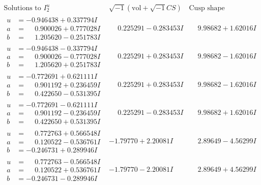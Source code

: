 \documentclass[1p]{elsarticle_modified}
\theoremstyle{definition}
\newcommand{\I}{\sqrt{-1}}
\begin{document}
$$\begin{array}{c|c|c}  
\text{Solutions to }I^u_{2}& \I (\text{vol} + \sqrt{-1}CS) & \text{Cusp shape}\\
 \hline 
\begin{aligned}
u &= -0.946438 + 0.337794 I \\
a &= \phantom{-}0.900026 + 0.777028 I \\
b &= \phantom{-}1.205620 - 0.251783 I\end{aligned}
 & \phantom{-}0.225291 - 0.283453 I & \phantom{-}9.98682 + 1.62016 I \\ \hline\begin{aligned}
u &= -0.946438 - 0.337794 I \\
a &= \phantom{-}0.900026 - 0.777028 I \\
b &= \phantom{-}1.205620 + 0.251783 I\end{aligned}
 & \phantom{-}0.225291 + 0.283453 I & \phantom{-}9.98682 - 1.62016 I \\ \hline\begin{aligned}
u &= -0.772691 + 0.621111 I \\
a &= \phantom{-}0.901192 + 0.236459 I \\
b &= \phantom{-}0.422650 - 0.531395 I\end{aligned}
 & \phantom{-}0.225291 + 0.283453 I & \phantom{-}9.98682 - 1.62016 I \\ \hline\begin{aligned}
u &= -0.772691 - 0.621111 I \\
a &= \phantom{-}0.901192 - 0.236459 I \\
b &= \phantom{-}0.422650 + 0.531395 I\end{aligned}
 & \phantom{-}0.225291 - 0.283453 I & \phantom{-}9.98682 + 1.62016 I \\ \hline\begin{aligned}
u &= \phantom{-}0.772763 + 0.566548 I \\
a &= \phantom{-}0.120522 - 0.536761 I \\
b &= -0.246731 + 0.289946 I\end{aligned}
 & -1.79770 + 2.20081 I & \phantom{-}2.89649 - 4.56299 I \\ \hline\begin{aligned}
u &= \phantom{-}0.772763 - 0.566548 I \\
a &= \phantom{-}0.120522 + 0.536761 I \\
b &= -0.246731 - 0.289946 I\end{aligned}
 & -1.79770 - 2.20081 I & \phantom{-}2.89649 + 4.56299 I \\ \hline\begin{aligned}

\end{aligned}
\end{array}$$
\end{document}
